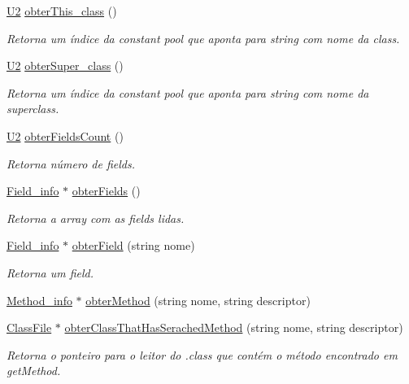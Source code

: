 \begin{DoxyCompactItemize}
\hyperlink{BasicTypes_8h_a90240657108b1b457eef9d3f76e0202e}{U2} \hyperlink{classClassFile_aec88c5432526d16b546ed59e5cec2136}{obter\+This\+\_\+class} ()
\begin{DoxyCompactList}\small\item\em Retorna um índice da constant pool que aponta para string com nome da class. \end{DoxyCompactList}\item 
\hyperlink{BasicTypes_8h_a90240657108b1b457eef9d3f76e0202e}{U2} \hyperlink{classClassFile_a8f248001f388181db10e76602031d560}{obter\+Super\+\_\+class} ()
\begin{DoxyCompactList}\small\item\em Retorna um índice da constant pool que aponta para string com nome da superclass. \end{DoxyCompactList}\item 
\hyperlink{BasicTypes_8h_a90240657108b1b457eef9d3f76e0202e}{U2} \hyperlink{classClassFile_a0be559cd8b7b3168c81a2782e4facb0c}{obter\+Fields\+Count} ()
\begin{DoxyCompactList}\small\item\em Retorna número de fields. \end{DoxyCompactList}\item 
\hyperlink{structField__info}{Field\+\_\+info} $\ast$ \hyperlink{classClassFile_ac3aabaa918413884416692b29165b463}{obter\+Fields} ()
\begin{DoxyCompactList}\small\item\em Retorna a array com as fields lidas. \end{DoxyCompactList}\item 
\hyperlink{structField__info}{Field\+\_\+info} $\ast$ \hyperlink{classClassFile_a1ae90b1662ca222c9910c14997b20eaa}{obter\+Field} (string nome)
\begin{DoxyCompactList}\small\item\em Retorna um field. \end{DoxyCompactList}\item 
\hyperlink{structMethod__info}{Method\+\_\+info} $\ast$ \hyperlink{classClassFile_aac49e7e39f677987b53fdf15787b8106}{obter\+Method} (string nome, string descriptor)
\item 
\hyperlink{classClassFile}{Class\+File} $\ast$ \hyperlink{classClassFile_a4d0ac62c4d6218ddada33f715ebaf633}{obter\+Class\+That\+Has\+Serached\+Method} (string nome, string descriptor)
\begin{DoxyCompactList}\small\item\em Retorna o ponteiro para o leitor do .class que contém o método encontrado em get\+Method. \end{DoxyCompactList}\item 

\end{DoxyCompactItemize}
